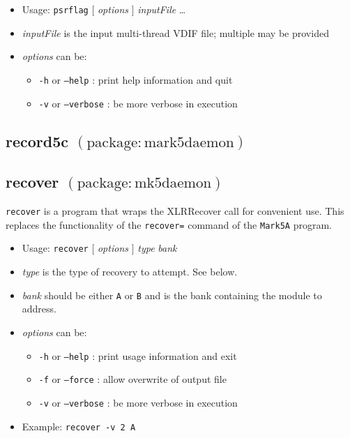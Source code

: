 \begin{itemize}
\item[] Usage: {\tt psrflag} $ [ $ {\em options} $ ] $ {\em inputFile} \ldots
\item[] {\em inputFile} is the input multi-thread VDIF file; multiple may be provided
\item[] {\em options} can be:
\begin{itemize}
\item[] {\tt -h} or {\tt --help} : print help information and quit
\item[] {\tt -v} or {\tt --verbose} : be more verbose in execution
\end{itemize}
\end{itemize}



\subsection{record5c {\small $\mathrm{(package: mark5daemon)}$}} \label{sec:record5c}





\subsection{recover {\small $\mathrm{(package: mk5daemon)}$}} \label{sec:recover}

{\tt recover} is a program that wraps the XLRRecover call for convenient use.
This replaces the functionality of the {\tt recover=} command of the {\tt Mark5A} program.

\begin{itemize}
\item[] Usage: {\tt recover} $[$ {\em options} $]$ {\em type} {\em bank}

\item[] {\em type} is the type of recovery to attempt.  See below.
\item[] {\em bank} should be either {\tt A} or {\tt B} and is the bank containing the module to address.
\item[] {\em options} can be:
\begin{itemize}
\item[] {\tt -h} or {\tt --help} : print usage information and exit
\item[] {\tt -f} or {\tt --force} : allow overwrite of output file
\item[] {\tt -v} or {\tt --verbose} : be more verbose in execution
\end{itemize}
\item[] Example: {\tt recover -v 2 A}
\end{itemize}

